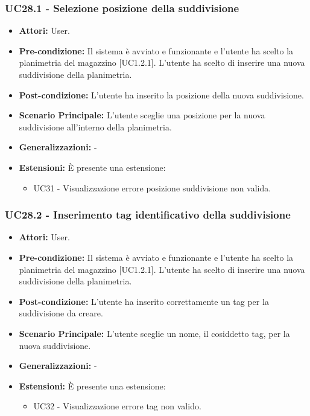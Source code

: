 \subsubsection{UC28.1 - Selezione posizione della suddivisione}
\begin{itemize}
    \item \textbf{Attori:} User.
    \item \textbf{Pre-condizione:} Il sistema è avviato e funzionante e l’utente ha scelto la planimetria del magazzino [UC1.2.1]. L'utente ha scelto di inserire una nuova suddivisione della planimetria.
    \item \textbf{Post-condizione:} L'utente ha inserito la posizione della nuova suddivisione.
    \item \textbf{Scenario Principale:} L'utente sceglie una posizione per la nuova suddivisione all'interno della planimetria.
    \item \textbf{Generalizzazioni:} -
    \item \textbf{Estensioni:} È presente una estensione:
        \begin{itemize}
            \item UC31 - Visualizzazione errore posizione suddivisione non valida.
        \end{itemize}
\end{itemize}

\subsubsection{UC28.2 - Inserimento tag identificativo della suddivisione}
\begin{itemize}
    \item \textbf{Attori:} User.
    \item \textbf{Pre-condizione:} Il sistema è avviato e funzionante e l’utente ha scelto la planimetria del magazzino [UC1.2.1]. L'utente ha scelto di inserire una nuova suddivisione della planimetria.
    \item \textbf{Post-condizione:} L'utente ha inserito correttamente un tag per la suddivisione da creare.
    \item \textbf{Scenario Principale:} L'utente sceglie un nome, il cosiddetto tag, per la nuova suddivisione.
    \item \textbf{Generalizzazioni:} -
    \item \textbf{Estensioni:} È presente una estensione:
        \begin{itemize}
            \item UC32 - Visualizzazione errore tag non valido.
        \end{itemize}
\end{itemize}